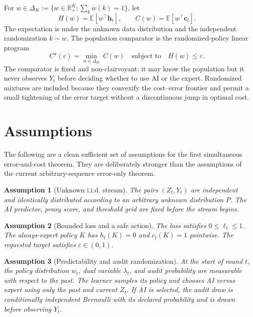 \documentclass[11pt]{article}
\newtheorem{assumption}{Assumption}
\newcommand{\E}{\mathbb{E}}
\newcommand{\R}{\mathbb{R}}
\newcommand{\eps}{\varepsilon}
\newcommand{\simplex}{\Delta_K}
\newcommand{\hvec}{\boldsymbol h}
\newcommand{\cvec}{\boldsymbol c}
\begin{document}
For $w\in\simplex:=\{w\in\R_+^K:\sum_k w(k)=1\}$, let
\begin{equation}
  H(w)=\E[w^\top\hvec_t],
  \qquad
  C(w)=\E[w^\top\cvec_t].
  \label{eq:population-HC}
\end{equation}
The expectation is under the unknown data distribution and the independent
randomization $k\sim w$.  The population comparator is the randomized-policy
linear program
\begin{equation}
  C^\star(\eps)
  =
  \min_{w\in\simplex}\ C(w)
  \quad\text{subject to}\quad
  H(w)\le\eps.
  \label{eq:population-comparator}
\end{equation}
The comparator is fixed and non-clairvoyant: it may know the population but it
never observes $Y_t$ before deciding whether to use AI or the expert.
Randomized mixtures are included because they convexify the cost--error
frontier and permit a small tightening of the error target without a
discontinuous jump in optimal cost.

\section{Assumptions}

The following are a clean sufficient set of assumptions for the first
simultaneous error-and-cost theorem.  They are deliberately stronger than the
assumptions of the current arbitrary-sequence error-only theorem.

\begin{assumption}[Unknown i.i.d. stream]
\label{ass:iid}
The pairs $(Z_t,Y_t)$ are independent and identically distributed according to
an arbitrary unknown distribution $P$.  The AI predictor, proxy score, and
threshold grid are fixed before the stream begins.
\end{assumption}

\begin{assumption}[Bounded loss and a safe action]
\label{ass:safe}
The loss satisfies $0\le\ell_t\le1$.  The always-expert policy $K$ has
$h_t(K)=0$ and $c_t(K)=1$ pointwise.  The requested target satisfies
$\eps\in(0,1)$.
\end{assumption}

\begin{assumption}[Predictability and audit randomization]
\label{ass:predictability}
At the start of round $t$, the policy distribution $w_t$, dual variable
$\lambda_t$, and audit probability are measurable with respect to the past.
The learner samples its policy and chooses AI versus expert using only the past
and current $Z_t$.  If AI is selected, the audit draw is conditionally
independent Bernoulli with its declared probability and is drawn before
observing $Y_t$.
\end{assumption}
\end{document}
